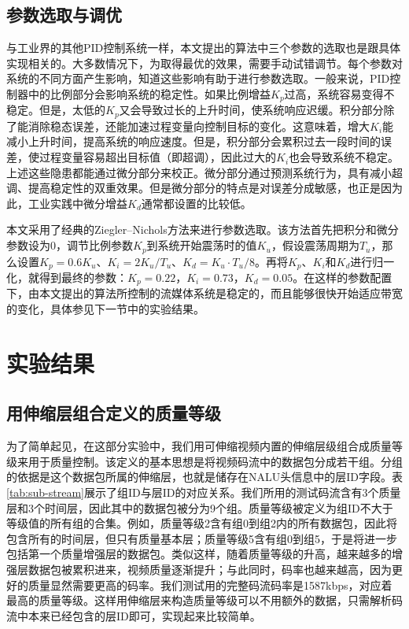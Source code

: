 \subsection{参数选取与调优}

与工业界的其他PID控制系统一样，本文提出的算法中三个参数的选取也是跟具体实现相关的。大多数情况下，为取得最优的效果，需要手动试错调节。每个参数对系统的不同方面产生影响，知道这些影响有助于进行参数选取。一般来说，PID控制器中的比例部分会影响系统的稳定性。如果比例增益$K_p$过高，系统容易变得不稳定。但是，太低的$K_p$又会导致过长的上升时间，使系统响应迟缓。积分部分除了能消除稳态误差，还能加速过程变量向控制目标的变化。这意味着，增大$K_i$能减小上升时间，提高系统的响应速度。但是，积分部分会累积过去一段时间的误差，使过程变量容易超出目标值（即超调），因此过大的$K_i$也会导致系统不稳定。上述这些隐患都能通过微分部分来校正。微分部分通过预测系统行为，具有减小超调、提高稳定性的双重效果。但是微分部分的特点是对误差分成敏感，也正是因为此，工业实践中微分增益$K_d$通常都设置的比较低。

本文采用了经典的Ziegler--Nichols方法\supercite{Ziegler1942}来进行参数选取。该方法首先把积分和微分参数设为0，调节比例参数$K_p$到系统开始震荡时的值$K_u$，假设震荡周期为$T_u$，那么设置$K_p = 0.6K_u$、$K_i = 2K_u/T_u$、$K_d = K_u \cdot T_u/8$。再将$K_p$、$K_i$和$K_d$进行归一化，就得到最终的参数：$K_p = 0.22$，$K_i = 0.73$，$K_d = 0.05$。在这样的参数配置下，由本文提出的算法所控制的流媒体系统是稳定的，而且能够很快开始适应带宽的变化，具体参见下一节中的实验结果。

\section{实验结果}

\subsection{用伸缩层组合定义的质量等级}

为了简单起见，在这部分实验中，我们用可伸缩视频内置的伸缩层级组合成质量等级来用于质量控制。该定义的基本思想是将视频码流中的数据包分成若干组。分组的依据是这个数据包所属的伸缩层，也就是储存在NALU头信息中的层ID字段。表\ref{tab:sub-stream}展示了组ID与层ID的对应关系。我们所用的测试码流含有3个质量层和3个时间层，因此其中的数据包被分为9个组。质量等级被定义为组ID不大于等级值的所有组的合集。例如，质量等级2含有组0到组2内的所有数据包，因此将包含所有的时间层，但只有质量基本层；质量等级5含有组0到组5，于是将进一步包括第一个质量增强层的数据包。类似这样，随着质量等级的升高，越来越多的增强层数据包被累积进来，视频质量逐渐提升；与此同时，码率也越来越高，因为更好的质量显然需要更高的码率。我们测试用的完整码流码率是1587kbps，对应着最高的质量等级。这样用伸缩层来构造质量等级可以不用额外的数据，只需解析码流中本来已经包含的层ID即可，实现起来比较简单。

